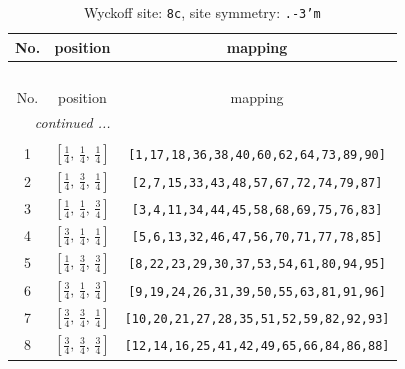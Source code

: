 \documentclass[fleqn,8pt]{jsarticle}
\begin{document}
\begin{longtable}{ccc}
\caption{Wyckoff site: {\tt 8c}, site symmetry: {\tt .-3'm}}
 \\
 \hline \hline
No. & position & mapping \\ \hline \endfirsthead

\multicolumn{2}{l}{\tablename\ \thetable{}} \\
 \hline \hline
No. & position & mapping \\ \hline \endhead

 \hline \hline
\multicolumn{2}{r}{\footnotesize\it continued ...} \\ \endfoot

 \hline \hline
\multicolumn{2}{r}{} \\ \endlastfoot

1 & $\left[ \frac{1}{4},\, \frac{1}{4},\, \frac{1}{4} \right]$ & {\tt [1,17,18,36,38,40,60,62,64,73,89,90]} \\ \hline
2 & $\left[ \frac{1}{4},\, \frac{3}{4},\, \frac{1}{4} \right]$ & {\tt [2,7,15,33,43,48,57,67,72,74,79,87]} \\ \hline
3 & $\left[ \frac{1}{4},\, \frac{1}{4},\, \frac{3}{4} \right]$ & {\tt [3,4,11,34,44,45,58,68,69,75,76,83]} \\ \hline
4 & $\left[ \frac{3}{4},\, \frac{1}{4},\, \frac{1}{4} \right]$ & {\tt [5,6,13,32,46,47,56,70,71,77,78,85]} \\ \hline
5 & $\left[ \frac{1}{4},\, \frac{3}{4},\, \frac{3}{4} \right]$ & {\tt [8,22,23,29,30,37,53,54,61,80,94,95]} \\ \hline
6 & $\left[ \frac{3}{4},\, \frac{1}{4},\, \frac{3}{4} \right]$ & {\tt [9,19,24,26,31,39,50,55,63,81,91,96]} \\ \hline
7 & $\left[ \frac{3}{4},\, \frac{3}{4},\, \frac{1}{4} \right]$ & {\tt [10,20,21,27,28,35,51,52,59,82,92,93]} \\ \hline
8 & $\left[ \frac{3}{4},\, \frac{3}{4},\, \frac{3}{4} \right]$ & {\tt [12,14,16,25,41,42,49,65,66,84,86,88]} \\
\end{longtable}
\renewcommand{\arraystretch}{1.2}
\end{document}
